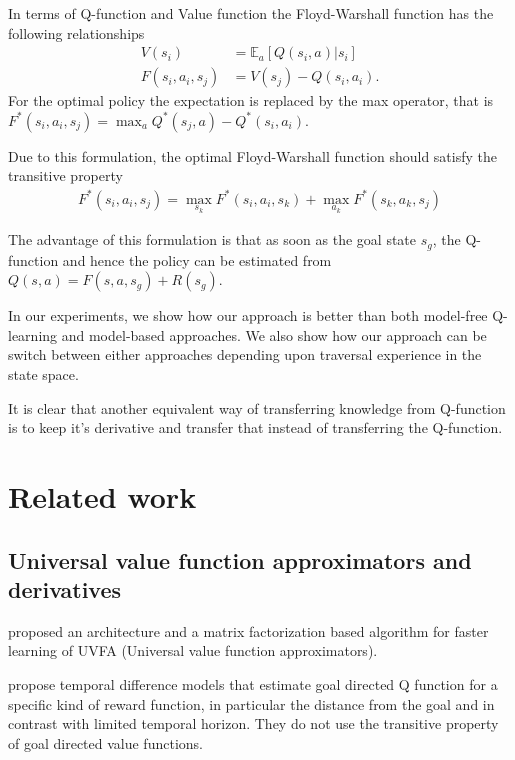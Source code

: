 \documentclass[letterpaper]{article} %
\def\state{s}
\def\act{a}
\def\Rew{R}
\def\E{\mathbb{E}}
\newcommand{\state}[2]{\mathbf{s}^{#1}(#2)}
\begin{document}
In terms of Q-function and Value function the Floyd-Warshall function has the following relationships
\begin{align}
V(\state_i) &= \E_{\act}[Q(\state_i, \act)|\state_i] \\
F(\state_i, \act_i, \state_j) &= V(\state_j) - Q(\state_i, \act_i).
\end{align}
For the optimal policy the expectation is replaced by the max operator, that is $F^*(\state_i, \act_i, \state_j) = \max_{\act} Q^*(\state_j, \act) - Q^*(\state_i, \act_i)$.

Due to this formulation, the optimal Floyd-Warshall function should satisfy the transitive property
\begin{align}
F^*(\state_i, \act_i, \state_j) = \max_{\state_k} F^*(\state_i, \act_i, \state_k)
+ \max_{\act_k}F^*(\state_k, \act_k, \state_j)
\label{eq:transitive-fw}
\end{align}

The advantage of this formulation is that as soon as the goal state $\state_g$, the Q-function and
hence the policy can be estimated from $Q(\state, \act) = F(\state, \act, \state_g) + \Rew(\state_g)$.

In our experiments, we show how our approach is better than both model-free Q-learning and model-based approaches. We also show how our approach can be switch between either approaches depending upon traversal experience in the state space.

It is clear that another equivalent way of transferring knowledge from Q-function is to keep it's derivative and transfer that instead of transferring the Q-function.

\section{Related work}

\subsection{Universal value function approximators and derivatives}
\cite{schaul2015universal} proposed an architecture and a matrix factorization based algorithm for faster learning of UVFA (Universal value function approximators).

\cite{pong2018temporal} propose temporal difference models that estimate goal directed Q function for a specific kind of reward function, in particular the distance from the goal and in contrast with limited temporal horizon.
They do not use the transitive property of goal directed value functions.
\end{document}
